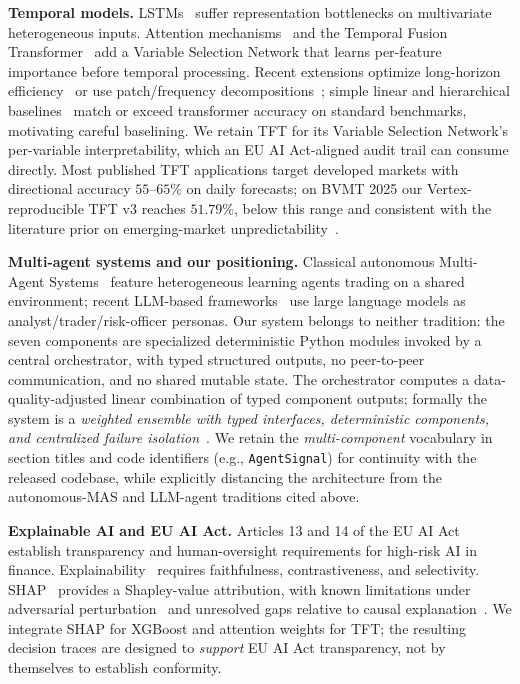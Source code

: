 \documentclass[conference]{IEEEtran}
\begin{document}
\textbf{Temporal models.} LSTMs~\cite{ref:lstm} suffer representation bottlenecks on multivariate heterogeneous inputs. Attention mechanisms~\cite{ref:vaswani} and the Temporal Fusion Transformer~\cite{IEEEhowto:kopka} add a Variable Selection Network that learns per-feature importance before temporal processing. Recent extensions optimize long-horizon efficiency~\cite{ref:informer,ref:autoformer,ref:fedformer,ref:patchtst,ref:itransformer} or use patch/frequency decompositions~\cite{ref:timesnet,ref:timemixer}; simple linear and hierarchical baselines~\cite{ref:dlinear,ref:nhits} match or exceed transformer accuracy on standard benchmarks, motivating careful baselining. We retain TFT for its Variable Selection Network's per-variable interpretability, which an EU AI Act-aligned audit trail can consume directly. Most published TFT applications target developed markets with directional accuracy $55$--$65\%$ on daily forecasts; on BVMT 2025 our Vertex-reproducible TFT v3 reaches $51.79\%$, below this range and consistent with the literature prior on emerging-market unpredictability~\cite{ref:bekaert_harvey,ref:harvey_multiple}.

\textbf{Multi-agent systems and our positioning.} Classical autonomous Multi-Agent Systems~\cite{ref:multi_agent} feature heterogeneous learning agents trading on a shared environment; recent LLM-based frameworks~\cite{ref:yang_fingpt,ref:lopez_lira_chatgpt} use large language models as analyst/trader/risk-officer personas. Our system belongs to neither tradition: the seven components are specialized deterministic Python modules invoked by a central orchestrator, with typed structured outputs, no peer-to-peer communication, and no shared mutable state. The orchestrator computes a data-quality-adjusted linear combination of typed component outputs; formally the system is a \emph{weighted ensemble with typed interfaces, deterministic components, and centralized failure isolation}~\cite{ref:ensemble}. We retain the \emph{multi-component} vocabulary in section titles and code identifiers (e.g., \texttt{AgentSignal}) for continuity with the released codebase, while explicitly distancing the architecture from the autonomous-MAS and LLM-agent traditions cited above.

\textbf{Explainable AI and EU AI Act.} Articles 13 and 14 of the EU AI Act~\cite{ref:eu_ai_act} establish transparency and human-oversight requirements for high-risk AI in finance. Explainability~\cite{ref:explainability} requires faithfulness, contrastiveness, and selectivity. SHAP~\cite{ref:shap} provides a Shapley-value attribution, with known limitations under adversarial perturbation~\cite{ref:slack_fooling,ref:alvarez_melis,ref:kumar_shap} and unresolved gaps relative to causal explanation~\cite{ref:veale_aiact,ref:mokander_audit}. We integrate SHAP for XGBoost and attention weights for TFT; the resulting decision traces are designed to \emph{support} EU AI Act transparency, not by themselves to establish conformity.
\end{document}
